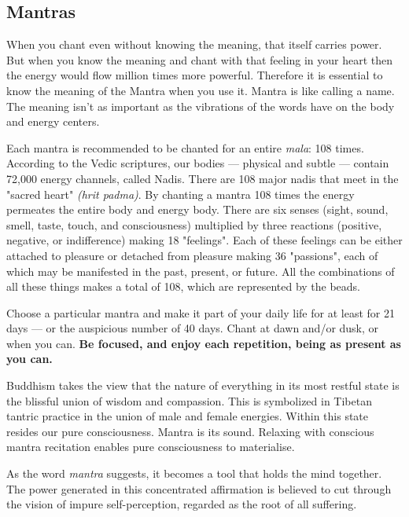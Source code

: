 %

  \subsection*{Mantras}
  
  When you chant even without knowing the meaning, that itself carries power. But when you know 
  the meaning and chant with that feeling in your heart then the energy would flow million times 
  more powerful. Therefore it is essential to know the meaning of the Mantra when you use it. 
  Mantra is like calling a name. The meaning isn't as important as the vibrations of the words 
  have on the body and energy centers.

  Each mantra is recommended to be chanted for an entire \emph{mala}: 108 times. According to the Vedic 
  scriptures, our bodies ---  physical and subtle --- contain 72,000 energy channels, called Nadis.
  There are 108 major nadis that meet in the "sacred heart" \emph{(hrit padma)}. By chanting a mantra 
  108 times the energy permeates the entire body and energy body.  There are six senses (sight, 
  sound, smell, taste, touch, and consciousness) multiplied by three reactions (positive, 
  negative, or indifference) making 18 "feelings". Each of these feelings can be either attached 
  to pleasure or detached from pleasure making 36 "passions", each of which may be manifested in 
  the past, present, or future. All the combinations of all these things makes a total of 108, 
  which are represented by the beads.

  Choose a particular mantra and make it part of your daily life for at least for 21 days --- or 
  the auspicious number of 40 days. Chant at dawn and/or dusk, or when you can. 
  \textbf{Be focused, and enjoy each repetition, being as present as you can.}

  Buddhism takes the view that the nature of everything in its most restful state is the blissful 
  union of wisdom and compassion. This is symbolized in Tibetan tantric practice in the union of 
  male and female energies. Within this state resides our pure consciousness. Mantra is its sound. 
  Relaxing with conscious mantra recitation enables pure consciousness to materialise. 

  As the word \emph{mantra} suggests, it becomes a tool that holds the mind together. The power 
  generated in this concentrated affirmation is believed to cut through the vision of impure 
  self-perception, regarded as the root of all suffering.

